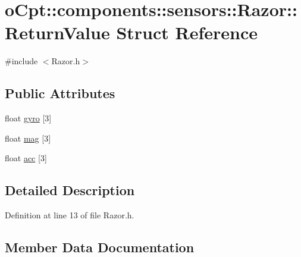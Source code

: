 \hypertarget{structo_cpt_1_1components_1_1sensors_1_1_razor_1_1_return_value}{}\section{o\+Cpt\+:\+:components\+:\+:sensors\+:\+:Razor\+:\+:Return\+Value Struct Reference}
\label{structo_cpt_1_1components_1_1sensors_1_1_razor_1_1_return_value}


{\ttfamily \#include $<$Razor.\+h$>$}

\subsection*{Public Attributes}
\begin{DoxyCompactItemize}
\item 
float \hyperlink{structo_cpt_1_1components_1_1sensors_1_1_razor_1_1_return_value_a4657a274087fb9d95dcfb6a3e9903a44}{gyro} \mbox{[}3\mbox{]}
\item 
float \hyperlink{structo_cpt_1_1components_1_1sensors_1_1_razor_1_1_return_value_ad8bcb98a9cb77104c53f11cd2fdd1d11}{mag} \mbox{[}3\mbox{]}
\item 
float \hyperlink{structo_cpt_1_1components_1_1sensors_1_1_razor_1_1_return_value_ace1cc2e8e54f10909747465ac2584cd0}{acc} \mbox{[}3\mbox{]}
\end{DoxyCompactItemize}


\subsection{Detailed Description}


Definition at line 13 of file Razor.\+h.



\subsection{Member Data Documentation}
\hypertarget{structo_cpt_1_1components_1_1sensors_1_1_razor_1_1_return_value_ace1cc2e8e54f10909747465ac2584cd0}{}\label{structo_cpt_1_1components_1_1sensors_1_1_razor_1_1_return_value_ace1cc2e8e54f10909747465ac2584cd0} 
